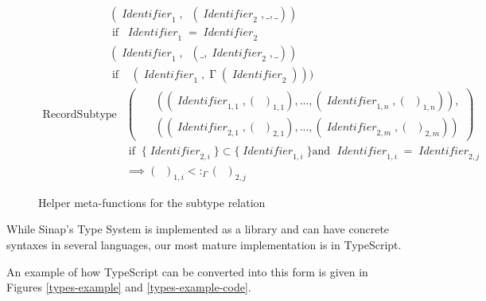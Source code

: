 \documentclass[12pt]{article}
\DeclareMathOperator{\RecT}{RecT_\Gamma}
\DeclareMathOperator{\ObjT}{ObjT_\Gamma}
\DeclareMathOperator{\LookupObjRef}{\Gamma}
\DeclareMathOperator{\Identifier}{\textit{Identifier}}
\DeclareMathOperator{\Type}{{\textit{Type}_\Gamma}}
\DeclareMathOperator{\ObjectSubtype}{ObjectSubtype_\Gamma}
\DeclareMathOperator{\RecordSubtype}{RecordSubtype}
\DeclareMathOperator{\textif}{ if }
\newcommand{\subtype}{<:_\Gamma}
\begin{document}
\begin{figure}
\begin{mdframed}        
\begin{align*}
    \ObjectSubtype&(\Identifier_1, \ObjT(\Identifier_2,\_, \_)) \\&\textif 
    \; \Identifier_1 = \Identifier_2\\
    \ObjectSubtype&(\Identifier_1, \ObjT(\_,\Identifier_2, \_)) \\&\textif 
    \;\ObjectSubtype(\Identifier_1, \LookupObjRef(\Identifier_2)))
\end{align*}
\begin{align*}
    \RecordSubtype &\left(\begin{aligned}
        &\RecT((\Identifier_{1,1}, (\Type)_{1, 1}), ..., (\Identifier_{1,n}, (\Type)_{1, n})), \\
        &\RecT((\Identifier_{2,1}, (\Type)_{2, 1}), ..., (\Identifier_{2,m}, (\Type)_{2, m}))
    \end{aligned}\right) \\
    &\textif\; \{\Identifier_{2,i}\} \subset \{\Identifier_{1,i}\}
    \text{and } \Identifier_{1, i} = \Identifier_{2, j} \\&\implies (\Type)_{1, i} \subtype (\Type)_{2, j}
\end{align*}
\end{mdframed}        
    \caption{Helper meta-functions for the subtype relation}
\label{subtype-helpers}
\end{figure}

While Sinap's Type System is implemented as a library and can have 
concrete syntaxes in several languages, our most mature implementation 
is in TypeScript. 

An example of how TypeScript can be converted into this form is given in 
Figures \ref{types-example} and \ref{types-example-code}. 
\end{document}
